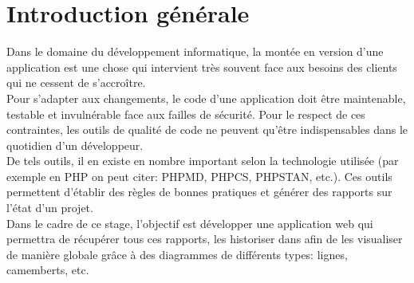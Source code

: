 \chapter*{Introduction générale}
Dans le domaine du développement informatique, la montée en version d'une application est une chose qui intervient très souvent face aux besoins des clients qui ne cessent de s'accroître.\\
Pour s'adapter aux changements, le code d'une application doit être maintenable, testable et invulnérable face aux failles de sécurité. Pour le respect de ces contraintes, les outils de qualité de code ne peuvent qu'être indispensables dans le quotidien d'un développeur.\\
De tels outils, il en existe en nombre important selon la technologie utilisée (par exemple en PHP on peut citer: PHPMD, PHPCS, PHPSTAN, etc.). Ces outils permettent d'établir des règles de bonnes pratiques et générer des rapports sur l'état d'un projet.\\
Dans le cadre de ce stage, l'objectif est développer une application web qui permettra de récupérer tous ces rapports, les historiser dans afin de les visualiser de manière globale grâce à des diagrammes de différents types: lignes, camemberts, etc.